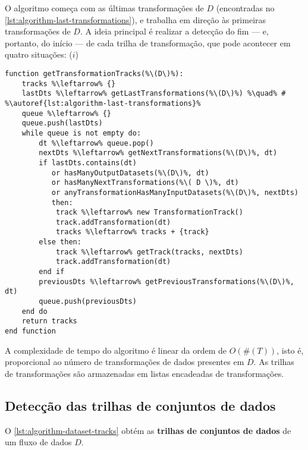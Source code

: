 
O algoritmo começa com as últimas transformações de \( D \) (encontradas no \autoref{lst:algorithm-last-transformations}), e trabalha em direção às primeiras transformações de \( D \). A ideia principal é realizar a detecção do fim --- e, portanto, do início --- de cada trilha de transformação, que pode acontecer em quatro situações: (\(i\)) 

\begin{minipage}[c]{0.95\textwidth}
\begin{lstlisting}[language=pseudocode,label={lst:algorithm-transformation-tracks},caption={[Detecção das trilhas de transformações]Detecção do rastro do fluxo de dados no nível de trilhas de transformações.}]
function getTransformationTracks(%\(D\)%):
    tracks %\leftarrow% {}
    lastDts %\leftarrow% getLastTransformations(%\(D\)%) %\quad% # %\autoref{lst:algorithm-last-transformations}%
    queue %\leftarrow% {}
    queue.push(lastDts)
    while queue is not empty do:
        dt %\leftarrow% queue.pop()
        nextDts %\leftarrow% getNextTransformations(%\(D\)%, dt)
        if lastDts.contains(dt)
           or hasManyOutputDatasets(%\(D\)%, dt)
           or hasManyNextTransformations(%\( D \)%, dt)
           or anyTransformationHasManyInputDatasets(%\(D\)%, nextDts)
           then:
            track %\leftarrow% new TransformationTrack()
            track.addTransformation(dt)
            tracks %\leftarrow% tracks + {track}
        else then:
            track %\leftarrow% getTrack(tracks, nextDts)
            track.addTransformation(dt)
        end if
        previousDts %\leftarrow% getPreviousTransformations(%\(D\)%, dt)
        queue.push(previousDts)
    end do
    return tracks
end function
\end{lstlisting}
\end{minipage}

A complexidade de tempo do algoritmo é linear da ordem de \( O(\#(T)) \), isto é, proporcional ao número de transformações de dados presentes em \( D \). As trilhas de transformações são armazenadas em listas encadeadas de transformações.

\subsection{Detecção das trilhas de conjuntos de dados}

O \autoref{lst:algorithm-dataset-tracks} obtém as \textbf{trilhas de conjuntos de dados} de um fluxo de dados \( D \).

